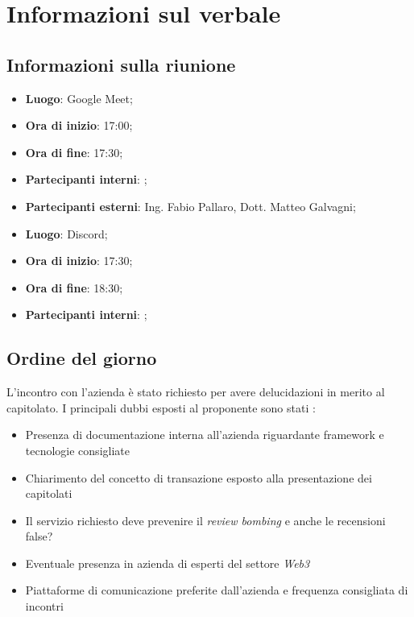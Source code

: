 \section{Informazioni sul verbale}

\subsection{Informazioni sulla riunione}

\begin{itemize}
	\item \textbf{Luogo}: Google Meet;
	\item \textbf{Ora di inizio}: 17:00;
	\item \textbf{Ora di fine}: 17:30;
	\item \textbf{Partecipanti interni}: \groupTeam;
	\item \textbf{Partecipanti esterni}: Ing. Fabio Pallaro, Dott. Matteo Galvagni;
\end{itemize}

\begin{itemize}
	\item \textbf{Luogo}: Discord;
	\item \textbf{Ora di inizio}: 17:30;
	\item \textbf{Ora di fine}: 18:30;
	\item \textbf{Partecipanti interni}: \groupTeam;
\end{itemize}

\medskip

\subsection{Ordine del giorno}
L'incontro con l'azienda è stato richiesto per avere delucidazioni in merito al capitolato. I principali dubbi esposti al proponente sono stati :
\begin{itemize}
	\item Presenza di documentazione interna all'azienda riguardante framework e tecnologie consigliate
	\item Chiarimento del concetto di transazione esposto alla presentazione dei
	capitolati
	\item Il servizio richiesto deve prevenire il \emph{review bombing} e anche
	le recensioni false?
	\item Eventuale presenza in azienda di esperti del settore \emph{Web3}
	\item Piattaforme di comunicazione preferite dall'azienda e frequenza
	consigliata di incontri
\end{itemize}
